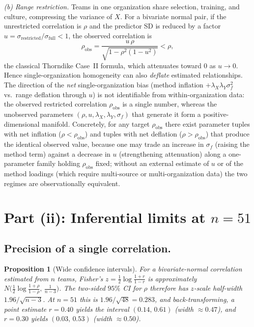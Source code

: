\documentclass{amsart}
\newtheorem{proposition}{Proposition}
\theoremstyle{definition}
\begin{document}
\emph{(b) Range restriction.} Teams in one organization share selection,
training, and culture, compressing the variance of $X$. For a bivariate
normal pair, if the unrestricted correlation is $\rho$ and the predictor SD
is reduced by a factor $u=\sigma_{\text{restricted}}/\sigma_{\text{full}}<1$,
the observed correlation is
\[
  \rho_{\text{obs}}=\frac{u\,\rho}{\sqrt{1-\rho^2(1-u^2)}}<\rho,
\]
the classical Thorndike Case~II formula, which attenuates toward $0$ as
$u\to0$. Hence single-organization homogeneity can also \emph{deflate}
estimated relationships. The direction of the \emph{net} single-organization
bias (method inflation $+\lambda_X\lambda_Y\sigma_f^2$ vs.\ range deflation
through $u$) is not identifiable from within-organization data: the observed
restricted correlation $\rho_{\text{obs}}$ is a single number, whereas the
unobserved parameters $(\rho,u,\lambda_X,\lambda_Y,\sigma_f)$ that generate
it form a positive-dimensional manifold. Concretely, for any target
$\rho_{\text{obs}}$ there exist parameter tuples with net inflation
($\rho<\rho_{\text{obs}}$) and tuples with net deflation
($\rho>\rho_{\text{obs}}$) that produce the identical observed value, because
one may trade an increase in $\sigma_f$ (raising the method term) against a
decrease in $u$ (strengthening attenuation) along a one-parameter family
holding $\rho_{\text{obs}}$ fixed; without an external estimate of $u$ or of
the method loadings (which require multi-source or multi-organization data)
the two regimes are observationally equivalent.

\section*{Part (ii): Inferential limits at $n=51$}

\subsection*{Precision of a single correlation.}
\begin{proposition}[Wide confidence intervals]\label{prop:ci}
For a bivariate-normal correlation estimated from $n$ teams, Fisher's
$z=\tfrac12\log\frac{1+r}{1-r}$ is approximately $N\!\big(\tfrac12\log\frac{1+\rho}{1-\rho},\,\frac1{n-3}\big)$.
The two-sided $95\%$ CI for $\rho$ therefore has $z$-scale half-width
$1.96/\sqrt{n-3}$. At $n=51$ this is $1.96/\sqrt{48}=0.283$, and back-transforming,
a point estimate $r=0.40$ yields the interval $(0.14,\,0.61)$ (width $\approx0.47$),
and $r=0.30$ yields $(0.03,\,0.53)$ (width $\approx0.50$).
\end{proposition}
\end{document}
